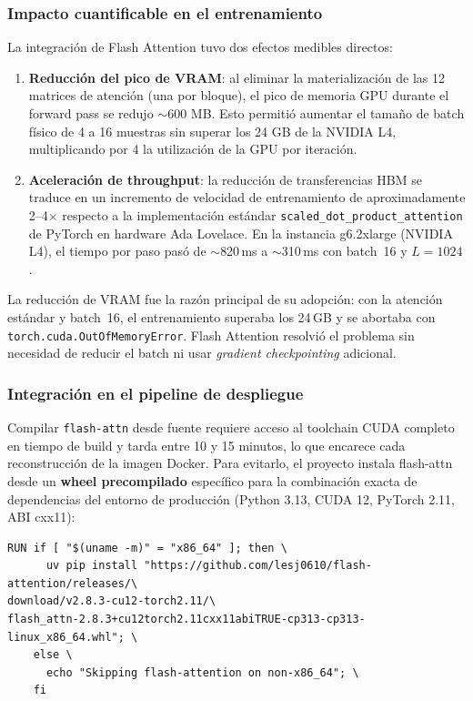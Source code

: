 \subsubsection{Impacto cuantificable en el entrenamiento}

La integración de Flash Attention tuvo dos efectos medibles directos:

\begin{enumerate}
    \item \textbf{Reducción del pico de VRAM}: al eliminar la materialización de las 12 matrices de atención (una por bloque), el pico de memoria GPU durante el forward pass se redujo $\sim$600 MB. Esto permitió aumentar el tamaño de batch físico de 4 a 16 muestras sin superar los 24 GB de la NVIDIA L4, multiplicando por 4 la utilización de la GPU por iteración.
    \item \textbf{Aceleración de throughput}: la reducción de transferencias HBM se traduce en un incremento de velocidad de entrenamiento de aproximadamente 2--4$\times$ respecto a la implementación estándar \texttt{scaled\_dot\_product\_\allowbreak{}attention} de PyTorch en hardware Ada Lovelace. En la instancia g6.2xlarge (NVIDIA L4), el tiempo por paso pasó de $\sim$820\,ms a $\sim$310\,ms con batch~16 y $L = 1024$.
\end{enumerate}

La reducción de VRAM fue la razón principal de su adopción: con la atención estándar y batch~16, el entrenamiento superaba los 24\,GB y se abortaba con \texttt{torch.cuda.\allowbreak{}OutOfMemoryError}. Flash Attention resolvió el problema sin necesidad de reducir el batch ni usar \textit{gradient checkpointing} adicional.

\subsubsection{Integración en el pipeline de despliegue}

Compilar \texttt{flash-attn} desde fuente requiere acceso al toolchain CUDA completo en tiempo de build y tarda entre 10 y 15 minutos, lo que encarece cada reconstrucción de la imagen Docker. Para evitarlo, el proyecto instala flash-attn desde un \textbf{wheel precompilado} específico para la combinación exacta de dependencias del entorno de producción (Python 3.13, CUDA 12, PyTorch 2.11, ABI cxx11):

{\small
\begin{verbatim}
RUN if [ "$(uname -m)" = "x86_64" ]; then \
      uv pip install "https://github.com/lesj0610/flash-attention/releases/\
download/v2.8.3-cu12-torch2.11/\
flash_attn-2.8.3+cu12torch2.11cxx11abiTRUE-cp313-cp313-linux_x86_64.whl"; \
    else \
      echo "Skipping flash-attention on non-x86_64"; \
    fi
\end{verbatim}
}

